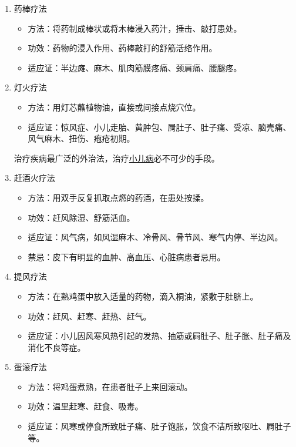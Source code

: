 \documentclass[cn,hazy,black,12pt,normal,founder]{elegantnote}
\newcommand{\redt}[1]{\textcolor{black}{{}#1}}      %
\begin{document}
\begin{enumerate}
  \item 药棒疗法
  \begin{itemize}
    \item 方法：将药制成棒状或将木棒浸入药汁，捶击、敲打患处。
    \item 功效：药物的浸入作用、药棒敲打的舒筋活络作用。
    \item 适应证：半边瘫、麻木、肌肉筋膜疼痛、颈肩痛、腰腿疼。
  \end{itemize}
  \item 灯火疗法
  \begin{itemize}
    \item 方法：用灯芯蘸植物油，直接或间接点烧穴位。
    \item 适应证：惊风症、小儿走胎、黄肿包、屙肚子、肚子痛、受凉、脑壳痛、风气麻木、扭伤、疱疮初期。
  \end{itemize}
  \begin{note}
  治疗疾病最广泛的外治法，治疗\redt{\uline{小儿病}}必不可少的手段。
  \end{note}
  \item 赶酒火疗法
  \begin{itemize}
    \item 方法：用双手反复抓取点燃的药酒，在患处按揉。
    \item 功效：赶风除湿、舒筋活血。
    \item 适应证：风气病，如风湿麻木、冷骨风、骨节风、寒气内停、半边风。
    \item \redt{禁忌：}皮下有明显的血肿、高血压、心脏病患者忌用。
  \end{itemize}
  \item 提风疗法
  \begin{itemize}
    \item 方法：在熟鸡蛋中放入适量的药物，滴入桐油，紧敷于肚脐上。
    \item 功效：赶风、赶寒、赶热、赶气。
    \item 适应证：小儿因风寒风热引起的发热、抽筋或屙肚子、肚子胀、肚子痛及消化不良等症。
  \end{itemize}
  \item 蛋滚疗法
  \begin{itemize}
    \item 方法：将鸡蛋煮熟，在患者肚子上来回滚动。
    \item 功效：温里赶寒、赶食、吸毒。
    \item 适应证：风寒或停食所致肚子痛、肚子饱胀，饮食不洁所致呕吐、屙肚子等。

\end{itemize}
\end{enumerate}
\end{document}
